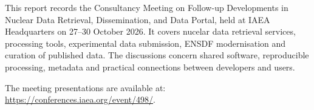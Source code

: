 This report records the Consultancy Meeting on Follow-up Developments in Nuclear Data Retrieval, Dissemination, and Data Portal, held at IAEA Headquarters on 27--30 October 2026. It covers nucelar data retrieval services, processing tools, experimental data submission, ENSDF modernisation and curation of published data. The discussions concern shared software, reproducible processing, metadata and practical connections between developers and users. 

The meeting presentations are available at: \url{https://conferences.iaea.org/event/498/}.



